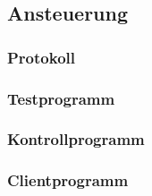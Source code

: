 \subsection{Ansteuerung}
\label{kap:Ansteuerung}

\subsubsection{Protokoll}

\subsubsection{Testprogramm}

\subsubsection{Kontrollprogramm}

\subsubsection{Clientprogramm}
